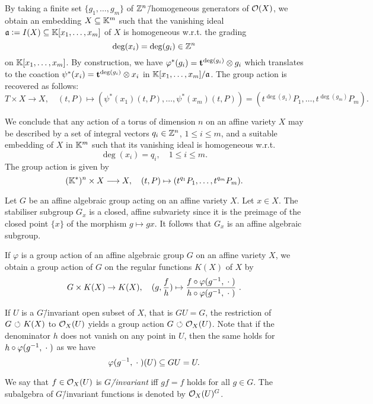 \begin{construction}
	By taking a finite set $\{g_1,\dots,g_m\}$ of $\mathbb{Z}^n$\=/homogeneous generators of $\mathcal{O}(X)$, we obtain an embedding $X\subseteq\mathbb{K}^m$ such that the vanishing ideal $\mathfrak{a} \mathrel{\mathop:}= I(X)\subseteq\mathbb{K}[x_1,\dots,x_m]$ of $X$ is homogeneous w.r.t. the grading
	$$\deg(x_i) = \deg(g_i)\in\mathbb{Z}^n$$
	on $\mathbb{K}[x_1,\dots,x_m]$.
	By construction, we have $\varphi^*(g_i) = \mathbf{t}^{\deg(g_i)} \otimes g_i$ which translates to the coaction  $\psi^*(x_i) = \mathbf{t}^{\deg(g_i)} \otimes x_i$ in $\mathbb{K}[x_1,\dots,x_m] / \mathfrak{a}$.
	The group action is recovered as follows:
	$$T \times X \longrightarrow X,\quad (t,P) \mapsto (\psi^*(x_1)(t,P),\dots,\psi^*(x_m)(t,P)) = (t^{\deg(g_1)}P_1,\dots,t^{\deg(g_m)}P_m).$$
	
	We conclude that any action of a torus of dimension $n$ on an affine variety $X$ may be described by a set of integral vectors $q_i\in\mathbb{Z}^n$, $1\leq i \leq m$, and a suitable embedding of $X$ in $\mathbb{K}^m$ such that its vanishing ideal is homogeneous w.r.t.
	$$\deg(x_i) = q_i,\quad 1\leq i \leq m.$$
	The group action is given by
	$$(\mathbb{K}^*)^n \times X \longrightarrow X,\quad (t,P) \mapsto (t^{q_1}P_1,\dots,t^{q_m}P_m).$$
\end{construction}

\begin{remark}
	Let $G$ be an affine algebraic group acting on an affine variety $X$. Let $x\in X$. The stabiliser subgroup $G_x$ is a closed, affine subvariety since it is the preimage of the closed point $\{x\}$ of the morphism $g\mapsto gx$. It follows that $G_x$ is an affine algebraic subgroup.
\end{remark}

\begin{remark}
	If $\varphi$ is a group action of an affine algebraic group $G$ on an affine variety $X$, we obtain a group action of $G$ on the regular functions $K(X)$ of $X$ by
	$$G\times K(X)\rightarrow K(X), \quad(g,\frac{f}{h}) \mapsto \frac{f\circ \varphi(g^{-1},\wildcard)}{h\circ \varphi(g^{-1},\wildcard)}\ .$$
	
	If $U$ is a $G$\=/invariant open subset of $X$, that is $GU = G$, the restriction of $G{\ \circlearrowleft\ } K(X)$ to $\mathcal{O}_X(U)$ yields a group action $G{\ \circlearrowleft\ }\mathcal{O}_X(U)$. Note that if the denominator $h$ does not vanish on any point in $U$, then the same holds for $h\circ \varphi(g^{-1},\mathrel{\;\cdot\;})$ as we have $$\varphi(g^{-1},\mathrel{\;\cdot\;})(U) \subseteq GU = U.$$
	
	We say that $f\in\mathcal{O}_X(U)$ is \emph{$G$\=/invariant} iff $gf = f$ holds for all $g\in G$. The subalgebra of $G$\=/invariant functions is denoted by $\mathcal{O}_X(U)^G$.
\end{remark}

